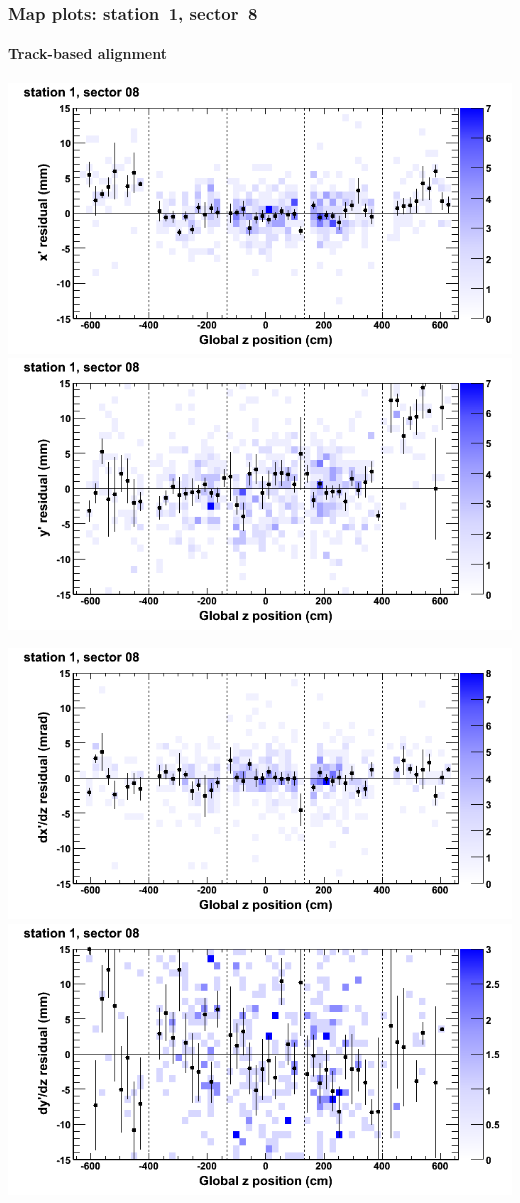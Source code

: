 \documentclass[compress]{beamer}
\begin{document}
\begin{frame}
\frametitle{Map plots: station~1, sector~8}
\framesubtitle{Track-based alignment}
\includegraphics[width=0.5\linewidth]{mapplots_re05/DTvsz_st1sec08_x.png}
\includegraphics[width=0.5\linewidth]{mapplots_re05/DTvsz_st1sec08_y.png}

\includegraphics[width=0.5\linewidth]{mapplots_re05/DTvsz_st1sec08_dxdz.png}
\includegraphics[width=0.5\linewidth]{mapplots_re05/DTvsz_st1sec08_dydz.png}
\end{frame}
\end{document}
